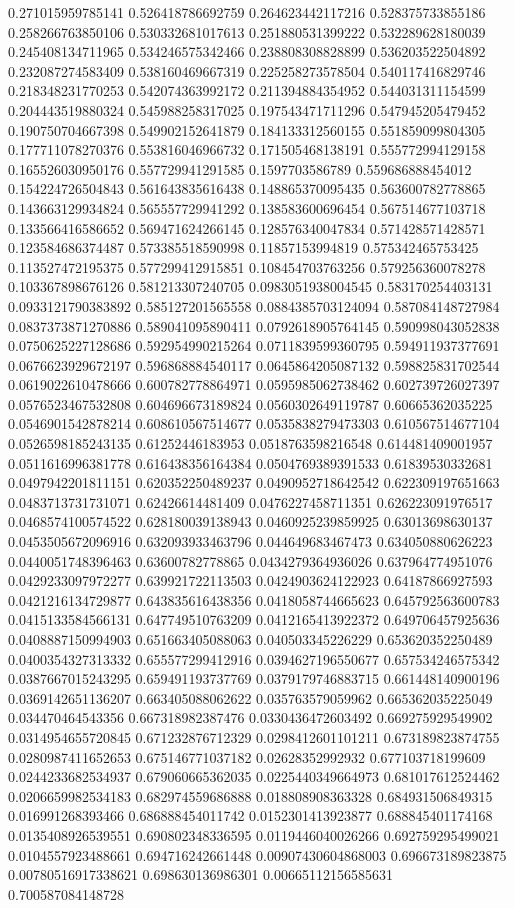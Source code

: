 \begin{table}
\begin{tabu}
\begin{sparkline}{10}
0.271015959785141 0.526418786692759 0.264623442117216 0.528375733855186 0.258266763850106 0.530332681017613 0.251880531399222 0.532289628180039 0.245408134711965 0.534246575342466 0.238808308828899 0.536203522504892 0.232087274583409 0.538160469667319 0.225258273578504 0.540117416829746 0.218348231770253 0.542074363992172 0.211394884354952 0.544031311154599 0.204443519880324 0.545988258317025 0.197543471711296 0.547945205479452 0.190750704667398 0.549902152641879 0.184133312560155 0.551859099804305 0.177711078270376 0.553816046966732 0.171505468138191 0.555772994129158 0.165526030950176 0.557729941291585 0.1597703586789 0.559686888454012 0.154224726504843 0.561643835616438 0.148865370095435 0.563600782778865 0.143663129934824 0.565557729941292 0.138583600696454 0.567514677103718 0.133566416586652 0.569471624266145 0.128576340047834 0.571428571428571 0.123584686374487 0.573385518590998 0.11857153994819 0.575342465753425 0.113527472195375 0.577299412915851 0.108454703763256 0.579256360078278 0.103367898676126 0.581213307240705 0.0983051938004545 0.583170254403131 0.0933121790383892 0.585127201565558 0.0884385703124094 0.587084148727984 0.0837373871270886 0.589041095890411 0.0792618905764145 0.590998043052838 0.0750625227128686 0.592954990215264 0.0711839599360795 0.594911937377691 0.0676623929672197 0.596868884540117 0.0645864205087132 0.598825831702544 0.0619022610478666 0.600782778864971 0.0595985062738462 0.602739726027397 0.0576523467532808 0.604696673189824 0.0560302649119787 0.60665362035225 0.0546901542878214 0.608610567514677 0.0535838279473303 0.610567514677104 0.0526598185243135 0.61252446183953 0.0518763598216548 0.614481409001957 0.0511616996381778 0.616438356164384 0.0504769389391533 0.61839530332681 0.0497942201811151 0.620352250489237 0.0490952718642542 0.622309197651663 0.0483713731731071 0.62426614481409 0.0476227458711351 0.626223091976517 0.0468574100574522 0.628180039138943 0.0460925239859925 0.63013698630137 0.0453505672096916 0.632093933463796 0.044649683467473 0.634050880626223 0.0440051748396463 0.63600782778865 0.0434279364936026 0.637964774951076 0.0429233097972277 0.639921722113503 0.0424903624122923 0.64187866927593 0.0421216134729877 0.643835616438356 0.0418058744665623 0.645792563600783 0.0415133584566131 0.647749510763209 0.0412165413922372 0.649706457925636 0.0408887150994903 0.651663405088063 0.040503345226229 0.653620352250489 0.0400354327313332 0.655577299412916 0.0394627196550677 0.657534246575342 0.0387667015243295 0.659491193737769 0.0379179746883715 0.661448140900196 0.0369142651136207 0.663405088062622 0.035763579059962 0.665362035225049 0.034470464543356 0.667318982387476 0.0330436472603492 0.669275929549902 0.0314954655720845 0.671232876712329 0.0298412601101211 0.673189823874755 0.0280987411652653 0.675146771037182 0.02628352992932 0.677103718199609 0.0244233682534937 0.679060665362035 0.0225440349664973 0.681017612524462 0.0206659982534183 0.682974559686888 0.018808908363328 0.684931506849315 0.016991268393466 0.686888454011742 0.0152301413923877 0.688845401174168 0.0135408926539551 0.690802348336595 0.0119446040026266 0.692759295499021 0.0104557923488661 0.694716242661448 0.00907430604868003 0.696673189823875 0.00780516917338621 0.698630136986301 0.00665112156585631 0.700587084148728 
\end{sparkline}
\end{tabu}
\end{table}
